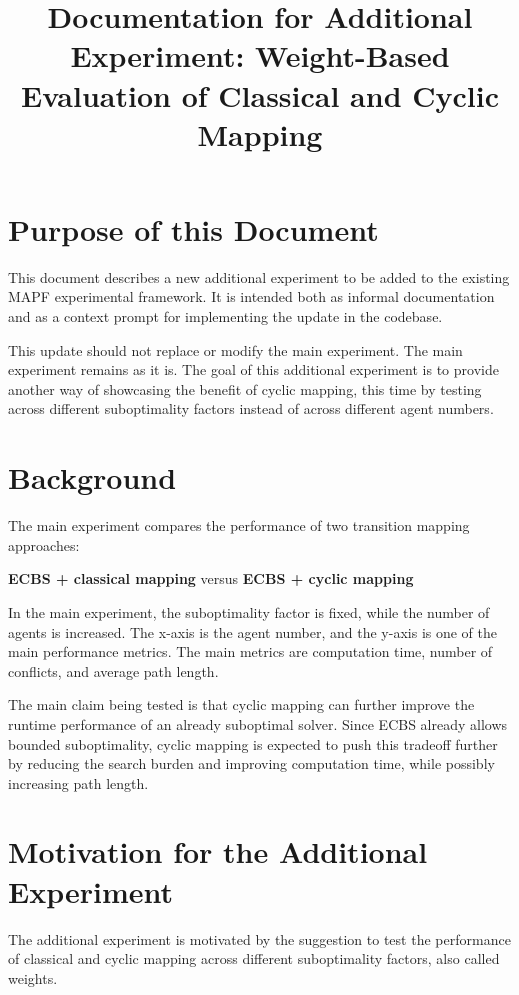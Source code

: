 \documentclass[11pt,a4paper]{article}
\title{\textbf{Documentation for Additional Experiment: Weight-Based Evaluation of Classical and Cyclic Mapping}}
\author{}
\date{}
\begin{document}
\maketitle

\section*{Purpose of this Document}

This document describes a new additional experiment to be added to the existing MAPF experimental framework. It is intended both as informal documentation and as a context prompt for implementing the update in the codebase.

This update should not replace or modify the main experiment. The main experiment remains as it is. The goal of this additional experiment is to provide another way of showcasing the benefit of cyclic mapping, this time by testing across different suboptimality factors instead of across different agent numbers.

\section*{Background}

The main experiment compares the performance of two transition mapping approaches:

\begin{center}
\textbf{ECBS + classical mapping}
\quad versus \quad
\textbf{ECBS + cyclic mapping}
\end{center}

In the main experiment, the suboptimality factor is fixed, while the number of agents is increased. The x-axis is the agent number, and the y-axis is one of the main performance metrics. The main metrics are computation time, number of conflicts, and average path length.

The main claim being tested is that cyclic mapping can further improve the runtime performance of an already suboptimal solver. Since ECBS already allows bounded suboptimality, cyclic mapping is expected to push this tradeoff further by reducing the search burden and improving computation time, while possibly increasing path length.

\section*{Motivation for the Additional Experiment}

The additional experiment is motivated by the suggestion to test the performance of classical and cyclic mapping across different suboptimality factors, also called weights.
\end{document}
